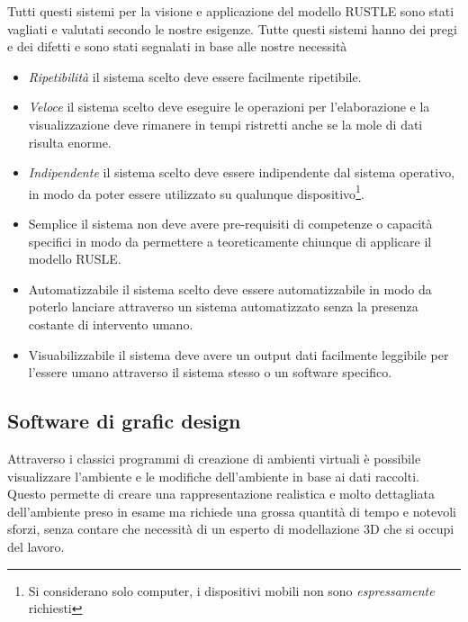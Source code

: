 Tutti questi sistemi per la visione e applicazione del modello RUSTLE sono stati vagliati e valutati secondo le nostre esigenze. Tutte questi sistemi hanno dei pregi e dei difetti e sono stati segnalati in base alle nostre necessità

\begin{itemize}


	\item \textit{Ripetibilità} il sistema scelto deve essere facilmente ripetibile.

	\item \textit{Veloce} il sistema scelto deve eseguire le operazioni per l'elaborazione e la visualizzazione deve rimanere in tempi ristretti anche se la mole di dati risulta enorme.

	\item \textit{Indipendente} il sistema scelto deve essere indipendente dal sistema operativo, in modo da poter essere utilizzato su qualunque dispositivo\footnote{Si considerano solo computer, i dispositivi mobili non sono \textit{espressamente} richiesti}.

	\item{Semplice} il sistema non deve avere pre-requisiti di competenze o capacità specifici in modo da permettere a teoreticamente chiunque di applicare il modello RUSLE.

	\item{Automatizzabile} il sistema scelto deve essere automatizzabile in modo da poterlo lanciare attraverso un sistema automatizzato senza la presenza costante di intervento umano.

	\item{Visuabilizzabile} il sistema deve avere un output dati facilmente leggibile per l'essere umano attraverso il sistema stesso o un software specifico.

\end{itemize}

\subsection{Software di grafic design}
Attraverso i classici programmi di creazione di ambienti virtuali è possibile visualizzare l'ambiente e le modifiche dell'ambiente in base ai dati raccolti. Questo permette di creare una rappresentazione realistica e molto dettagliata dell'ambiente preso in esame ma richiede una grossa quantità di tempo e notevoli sforzi, senza contare che necessità di un esperto di modellazione 3D che si occupi del lavoro.

